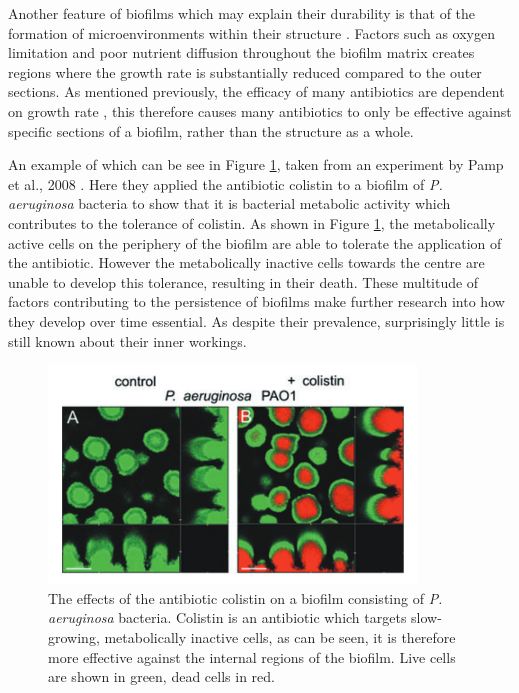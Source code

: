 \documentclass[a4paper,12pt]{article}
\begin{document}
Another feature of biofilms which may explain their durability is that of the formation of microenvironments within their structure \cite{bioref:Wimpenny-micrograds-1995}.  Factors such 
as oxygen limitation and poor nutrient diffusion throughout the biofilm matrix creates regions where the growth rate is substantially reduced compared to the outer sections.  As 
mentioned previously, the efficacy of many antibiotics are dependent on growth rate \cite{bioref:Field-gr-depend-antib-2005}, this therefore causes many antibiotics to only be effective 
against specific sections of a biofilm, rather than the structure as a whole.  

An example of which can be see in Figure \ref{fig:Pamp-dead-innards-biofilms}, taken from an experiment by Pamp et al., 2008 
\cite{bioref:Pamp-biofilm-internal-2008}.  Here they applied the antibiotic colistin to a biofilm of \textit{P. aeruginosa} bacteria to show that it is bacterial metabolic activity which 
contributes to the tolerance of colistin.  As shown in Figure \ref{fig:Pamp-dead-innards-biofilms}, the metabolically active cells on the periphery of the biofilm are able to tolerate 
the application of the antibiotic.  However the metabolically inactive cells towards the centre are unable to develop this tolerance, resulting in their death.  These multitude of 
factors contributing to the persistence of biofilms make further research into how they develop over time essential.  As despite their prevalence, surprisingly little is still known 
about their inner workings.

\begin{figure}[H]
 \centering
 \includegraphics[height=5.8cm]{Pamp-dead-biof-inside}
 \caption{The effects of the antibiotic colistin on a biofilm consisting of \textit{P. aeruginosa} bacteria.  Colistin is an antibiotic which targets slow-growing, metabolically 
 inactive cells, as can be seen, it is therefore more effective against the internal regions of the biofilm.  Live cells are shown in green, dead cells in red.}
 \label{fig:Pamp-dead-innards-biofilms}
\end{figure}
\end{document}
